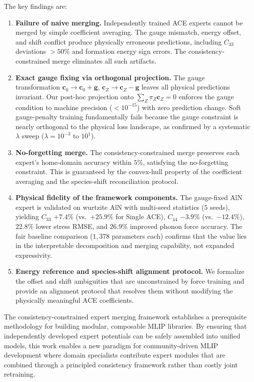 \documentclass[twoside,prb,aps,floatfix,superscriptaddress,longbibliography]{revtex4-2}
\newcommand{\g}{\mathbf{g}}
\newcommand{\cZ}{\mathbf{c}_{Z}}
\newcommand{\cb}{\mathbf{c}_{0}}
\begin{document}
The key findings are:

\begin{enumerate}[label=\textbf{(F\arabic*)}]
    \item \textbf{Failure of naive merging.} Independently trained ACE experts cannot be merged by simple coefficient averaging. The gauge mismatch, energy offset, and shift conflict produce physically erroneous predictions, including $C_{33}$ deviations $> 50\%$ and formation energy sign errors. The consistency-constrained merge eliminates all such artifacts.
    \item \textbf{Exact gauge fixing via orthogonal projection.} The gauge transformation $\cb \to \cb + \g$, $\cZ \to \cZ - \g$ leaves all physical predictions invariant. Our post-hoc projection onto $\sum_Z \pi_Z \cZ = 0$ enforces the gauge condition to machine precision ($< 10^{-15}$) with zero prediction change. Soft gauge-penalty training fundamentally fails because the gauge constraint is nearly orthogonal to the physical loss landscape, as confirmed by a systematic $\lambda$ sweep ($\lambda = 10^{-3}$ to $10^1$).
    \item \textbf{No-forgetting merge.} The consistency-constrained merge preserves each expert's home-domain accuracy within $5\%$, satisfying the no-forgetting constraint. This is guaranteed by the convex-hull property of the coefficient averaging and the species-shift reconciliation protocol.
    \item \textbf{Physical fidelity of the framework components.} The gauge-fixed AlN expert is validated on wurtzite AlN with multi-seed statistics ($5$ seeds), yielding $C_{33}$ $+7.4\%$ (vs.\ $+25.9\%$ for Single ACE), $C_{44}$ $-3.9\%$ (vs.\ $-12.4\%$), $22.8\%$ lower stress RMSE, and $26.9\%$ improved phonon force accuracy. The fair baseline comparison ($1{,}378$ parameters each) confirms that the value lies in the interpretable decomposition and merging capability, not expanded expressivity.
    \item \textbf{Energy reference and species-shift alignment protocol.} We formalize the offset and shift ambiguities that are unconstrained by force training and provide an alignment protocol that resolves them without modifying the physically meaningful ACE coefficients.
\end{enumerate}

The consistency-constrained expert merging framework establishes a prerequisite methodology for building modular, composable MLIP libraries. By ensuring that independently developed expert potentials can be safely assembled into unified models, this work enables a new paradigm for community-driven MLIP development where domain specialists contribute expert modules that are combined through a principled consistency framework rather than costly joint retraining.
\end{document}

